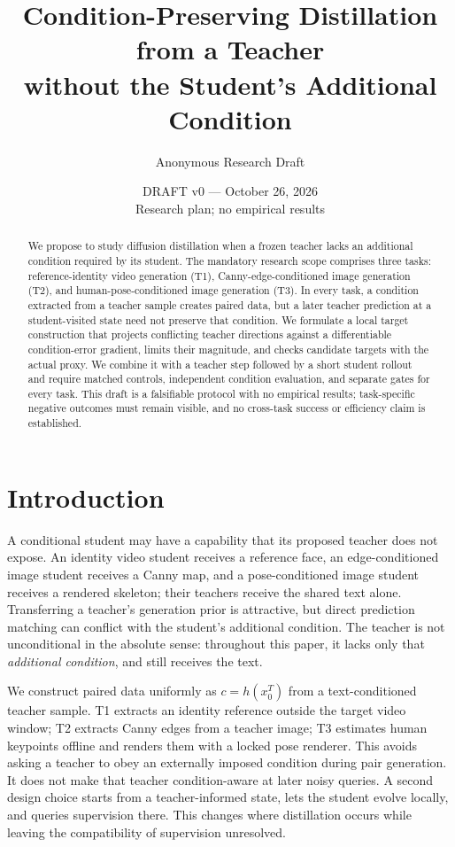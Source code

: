 \documentclass[11pt]{article}
\title{Condition-Preserving Distillation from a Teacher\\without the Student's Additional Condition}
\author{Anonymous Research Draft}
\date{DRAFT v0 --- October 26, 2026\\Research plan; no empirical results}
\begin{document}
\maketitle
\begin{abstract}
We propose to study diffusion distillation when a frozen teacher lacks an additional condition required by its student. The mandatory research scope comprises three tasks: reference-identity video generation (T1), Canny-edge-conditioned image generation (T2), and human-pose-conditioned image generation (T3). In every task, a condition extracted from a teacher sample creates paired data, but a later teacher prediction at a student-visited state need not preserve that condition. We formulate a local target construction that projects conflicting teacher directions against a differentiable condition-error gradient, limits their magnitude, and checks candidate targets with the actual proxy. We combine it with a teacher step followed by a short student rollout and require matched controls, independent condition evaluation, and separate gates for every task. This draft is a falsifiable protocol with no empirical results; task-specific negative outcomes must remain visible, and no cross-task success or efficiency claim is established.
\end{abstract}

\section{Introduction}
A conditional student may have a capability that its proposed teacher does not expose. An identity video student receives a reference face, an edge-conditioned image student receives a Canny map, and a pose-conditioned image student receives a rendered skeleton; their teachers receive the shared text alone. Transferring a teacher's generation prior is attractive, but direct prediction matching can conflict with the student's additional condition. The teacher is not unconditional in the absolute sense: throughout this paper, it lacks only that \emph{additional condition}, and still receives the text.

We construct paired data uniformly as $c=h(x_0^T)$ from a text-conditioned teacher sample. T1 extracts an identity reference outside the target video window; T2 extracts Canny edges from a teacher image; T3 estimates human keypoints offline and renders them with a locked pose renderer. This avoids asking a teacher to obey an externally imposed condition during pair generation. It does not make that teacher condition-aware at later noisy queries. A second design choice starts from a teacher-informed state, lets the student evolve locally, and queries supervision there. This changes where distillation occurs while leaving the compatibility of supervision unresolved.
\end{document}
